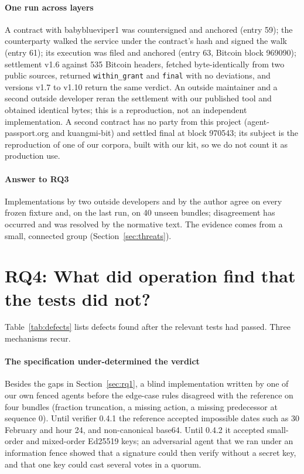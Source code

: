 \documentclass[preprint,12pt,authoryear]{elsarticle}
\newcommand{\code}[1]{\texttt{#1}}
\begin{document}
\paragraph{One run across layers} A contract with babyblueviper1 was countersigned and anchored (entry 59); the counterparty walked the service under the contract's hash and signed the walk (entry 61); its execution was filed and anchored (entry 63, Bitcoin block 969090); settlement v1.6 against 535 Bitcoin headers, fetched byte-identically from two public sources, returned \code{within\_grant} and \code{final} with no deviations, and versions v1.7 to v1.10 return the same verdict. An outside maintainer and a second outside developer reran the settlement with our published tool and obtained identical bytes; this is a reproduction, not an independent implementation. A second contract has no party from this project (agent-passport.org and kuangmi-bit) and settled final at block 970543; its subject is the reproduction of one of our corpora, built with our kit, so we do not count it as production use.

\paragraph{Answer to RQ3} Implementations by two outside developers and by the author agree on every frozen fixture and, on the last run, on 40 unseen bundles; disagreement has occurred and was resolved by the normative text. The evidence comes from a small, connected group (Section~\ref{sec:threats}).

\section{RQ4: What did operation find that the tests did not?}\label{sec:rq4}

Table~\ref{tab:defects} lists defects found after the relevant tests had passed. Three mechanisms recur.

\paragraph{The specification under-determined the verdict} Besides the gaps in Section~\ref{sec:rq1}, a blind implementation written by one of our own fenced agents before the edge-case rules disagreed with the reference on four bundles (fraction truncation, a missing action, a missing predecessor at sequence 0). Until verifier 0.4.1 the reference accepted impossible dates such as 30 February and hour 24, and non-canonical base64. Until 0.4.2 it accepted small-order and mixed-order Ed25519 keys; an adversarial agent that we ran under an information fence showed that a signature could then verify without a secret key, and that one key could cast several votes in a quorum.
\end{document}
